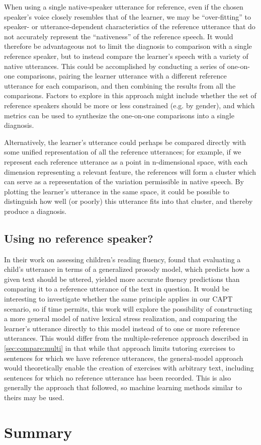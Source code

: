 	When using a single native-speaker utterance for reference, even if the chosen  speaker's voice closely resembles that of the learner, we may be ``over-fitting'' to speaker- or utterance-dependent characteristics of the reference utterance that do not accurately represent the ``nativeness'' of the reference speech. It would therefore be advantageous not to limit the diagnosis to comparison with a single reference speaker, but to instead compare the learner's speech with a variety of native utterances. This could be accomplished by conducting a series of one-on-one comparisons, pairing the learner utterance with a different reference utterance for each comparison, and then combining the results from all the comparisons.  Factors to explore in this approach might include whether the set of reference speakers should be more or less constrained (e.g. by gender), and which metrics can be used to synthesize the one-on-one comparisons into a single diagnosis.
	
	Alternatively, the learner's utterance could perhaps be compared directly with some unified representation of all the reference utterances; for example, if we represent each reference utterance as a point in n-dimensional space, with each dimension representing a relevant feature, the references will form a cluster which can serve as a representation of the variation permissible in native speech. By plotting the learner's utterance in the same space, it could be possible to distinguish how well (or poorly) this utterance fits into that cluster, and thereby produce a diagnosis.

	
	\subsection{Using no reference speaker?}
	\label{sec:compare:noref}
	
	In their work on assessing children's reading fluency, \textcite{Duong2011} found that evaluating a child's utterance in terms of a generalized prosody model, which predicts how a given text should be uttered, yielded more accurate fluency predictions than comparing it to a reference utterance of the text in question. It would be interesting to investigate whether the same principle applies in our CAPT scenario, so if time permits, this work will explore the possibility of constructing a more general model of native lexical stress realization, and comparing the learner's utterance directly to this model instead of to one or more reference utterances. This would differ from the multiple-reference approach described in \cref{sec:compare:multi} in that while that approach limits tutoring exercises to sentences for which we have reference utterances, the general-model approach would theoretically enable the creation of exercises with arbitrary text, including sentences for which no reference utterance has been recorded. This is also generally the approach that \textcite{Shahin2012a,Kim2011} followed, so machine learning methods similar to theirs may be used.

		
\section{Summary}
\label{sec:diag:summary}